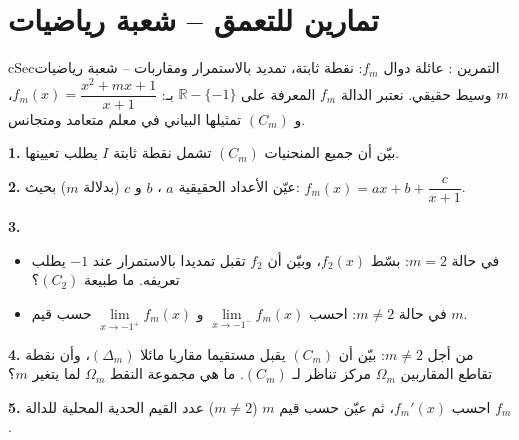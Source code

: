 \documentclass[12pt,a4paper]{article}
\newenvironment{BOX}[2]{\begin{otherlanguage}{english}\begin{arbox}{#1}{#2}}{\end{arbox}\end{otherlanguage}}
\newcounter{exo}
\newenvironment{tamrin}[1]{\stepcounter{exo}\begin{BOX}{cSec}{التمرين \theexo: #1}}{\end{BOX}}
\newcommand{\R}{\mathbb{R}}
\newenvironment{sq}{\begin{itemize}[leftmargin=2.4em,itemsep=3pt]}{\end{itemize}}
\newcommand{\qa}{\item[(أ)]}\newcommand{\qb}{\item[(ب)]}\newcommand{\qc}{\item[(جـ)]}\newcommand{\qd}{\item[(د)]}\newcommand{\qe}{\item[(هـ)]}
\newcommand{\QQ}[1]{\par\smallskip\textbf{#1.} }
\begin{document}
\section{تمارين للتعمق -- شعبة رياضيات}
\begin{tamrin}{عائلة دوال $f_m$: نقطة ثابتة، تمديد بالاستمرار ومقاربات -- شعبة رياضيات}
$m$ وسيط حقيقي. نعتبر الدالة $f_m$ المعرفة على $\R-\{-1\}$ بـ: $f_m(x)=\dfrac{x^{2}+mx+1}{x+1}$، و $(C_m)$ تمثيلها البياني في معلم متعامد ومتجانس.
\QQ{1} بيّن أن جميع المنحنيات $(C_m)$ تشمل نقطة ثابتة $I$ يطلب تعيينها.
\QQ{2} عيّن الأعداد الحقيقية $a$ ، $b$ و $c$ (بدلالة $m$) بحيث: $f_m(x)=ax+b+\dfrac{c}{x+1}$.
\QQ{3}
\begin{sq}
\qa في حالة $m=2$: بسّط $f_2(x)$، وبيّن أن $f_2$ تقبل تمديدا بالاستمرار عند $-1$ يطلب تعريفه. ما طبيعة $(C_2)$؟
\qb في حالة $m\neq2$: احسب $\lim\limits_{x\to-1^{-}}f_m(x)$ و $\lim\limits_{x\to-1^{+}}f_m(x)$ حسب قيم $m$.
\end{sq}
\QQ{4} من أجل $m\neq2$: بيّن أن $(C_m)$ يقبل مستقيما مقاربا مائلا $(\Delta_m)$، وأن نقطة تقاطع المقاربين $\Omega_m$ مركز تناظر لـ $(C_m)$. ما هي مجموعة النقط $\Omega_m$ لما يتغير $m$؟
\QQ{5} احسب $f_m'(x)$، ثم عيّن حسب قيم $m$ ($m\neq2$) عدد القيم الحدية المحلية للدالة $f_m$.
\end{tamrin}
\end{document}
